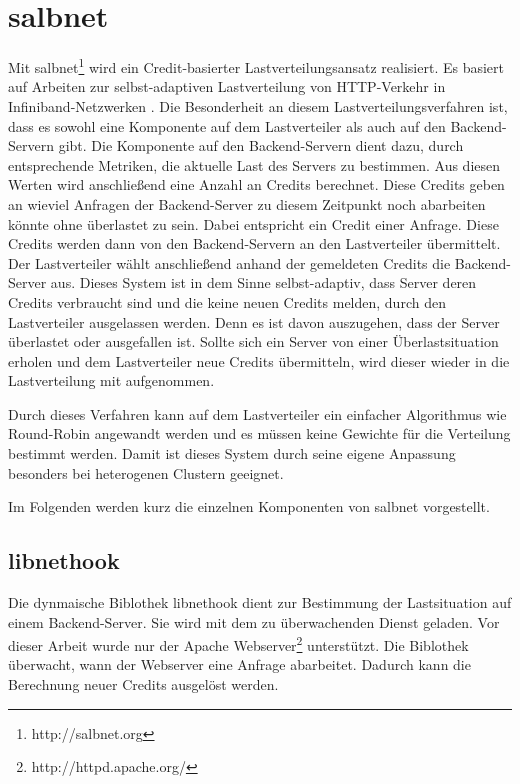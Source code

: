 \documentclass[a4paper, 12pt, BCOR10mm, DIV12, toc=bibliography, toc=listof, german]{scrbook}
\begin{document}


		\section{salbnet} %
		\label{sec:salbnet}

		Mit salbnet\footnote{http://salbnet.org} wird ein Credit-basierter Lastverteilungsansatz
		realisiert. Es basiert auf Arbeiten zur selbst-adaptiven Lastverteilung von HTTP-Verkehr in
		Infiniband-Netzwerken \cite{zinke2007, scsczile2008}. Die Besonderheit an diesem
		Lastverteilungsverfahren ist, dass es sowohl eine Komponente auf dem Lastverteiler als auch auf
		den Backend-Servern gibt. Die Komponente auf den Backend-Servern dient dazu, durch entsprechende
		Metriken, die aktuelle Last des Servers zu bestimmen. Aus diesen Werten wird anschließend eine
		Anzahl an Credits berechnet. Diese Credits geben an wieviel Anfragen der Backend-Server zu
		diesem Zeitpunkt noch abarbeiten könnte ohne überlastet zu sein. Dabei entspricht ein Credit
		einer Anfrage. Diese Credits werden dann von den Backend-Servern an den Lastverteiler
		übermittelt. Der Lastverteiler wählt anschließend anhand der gemeldeten Credits die
		Backend-Server aus. Dieses System ist in dem Sinne selbst-adaptiv, dass Server deren Credits
		verbraucht sind und die keine neuen Credits melden, durch den Lastverteiler ausgelassen werden.
		Denn es ist davon auszugehen, dass der Server überlastet oder ausgefallen ist. Sollte sich ein
		Server von einer Überlastsituation erholen und dem Lastverteiler neue Credits übermitteln, wird
		dieser wieder in die Lastverteilung mit aufgenommen.

		Durch dieses Verfahren kann auf dem Lastverteiler ein einfacher Algorithmus wie Round-Robin
		angewandt werden und es müssen keine Gewichte für die Verteilung bestimmt werden. Damit ist
		dieses System durch seine eigene Anpassung besonders bei heterogenen Clustern geeignet.

		Im Folgenden werden kurz die einzelnen Komponenten von salbnet vorgestellt.

			\subsection*{libnethook} %

			Die dynmaische Biblothek libnethook dient zur Bestimmung der Lastsituation auf einem
			Backend-Server. Sie wird mit dem zu überwachenden Dienst geladen. Vor dieser Arbeit wurde nur
			der Apache Webserver\footnote{http://httpd.apache.org/} unterstützt. Die Biblothek überwacht,
			wann der Webserver eine Anfrage abarbeitet. Dadurch kann die Berechnung neuer Credits
			ausgelöst werden.
			
\end{document}
